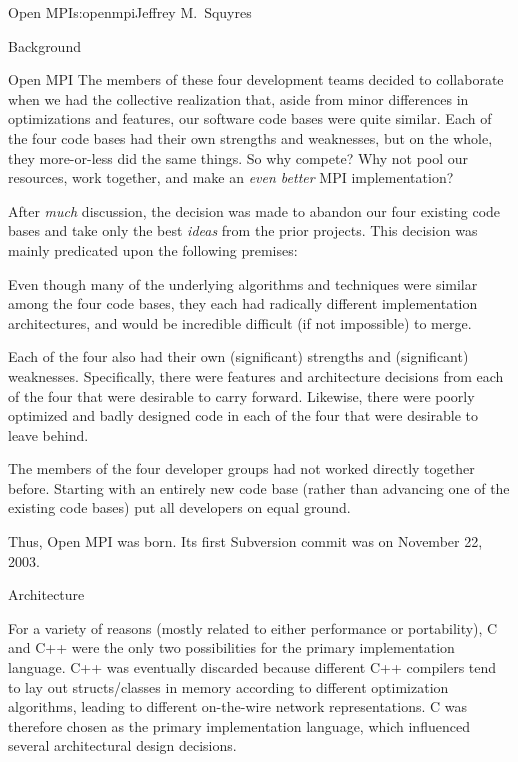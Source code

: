 \begin{aosachapter}{Open MPI}{s:openmpi}{Jeffrey M.\ Squyres}
\begin{aosasect1}{Background}
\begin{aosasect2}{Open MPI}
The members of these four development teams decided to collaborate
when we had the collective realization that, aside from minor
differences in optimizations and features, our software code bases
were quite similar.  Each of the four code bases had their own
strengths and weaknesses, but on the whole, they more-or-less did the
same things.  So why compete?  Why not pool our resources, work
together, and make an {\em even better} MPI implementation?

After {\em much} discussion, the decision was made to abandon our four
existing code bases and take only the best {\em ideas} from the prior
projects.  This decision was mainly predicated upon the following
premises:

\begin{aosaitemize}
\item Even though many of the underlying algorithms and techniques
  were similar among the four code bases, they each had radically
  different implementation architectures, and would be incredible
  difficult (if not impossible) to merge.
\item Each of the four also had their own (significant) strengths and
  (significant) weaknesses.  Specifically, there were features and
  architecture decisions from each of the four that were desirable to
  carry forward.  Likewise, there were poorly optimized and badly
  designed code in each of the four that were desirable to leave
  behind.
\item The members of the four developer groups had not worked directly
  together before.  Starting with an entirely new code base (rather
  than advancing one of the existing code bases) put all developers on
  equal ground.
\end{aosaitemize}

Thus, Open MPI was born.  Its first Subversion commit was on November
22, 2003.

\end{aosasect2}

\end{aosasect1}


\begin{aosasect1}{Architecture}

For a variety of reasons (mostly related to either performance or
portability), C and C++ were the only two possibilities for the
primary implementation language.  
%
C++ was eventually discarded because different C++ compilers tend to
lay out structs/classes in memory according to different optimization
algorithms, leading to different on-the-wire network representations.
%
C was therefore chosen as the primary implementation language, which
influenced several architectural design decisions.


\end{aosasect1}
\end{aosachapter}
